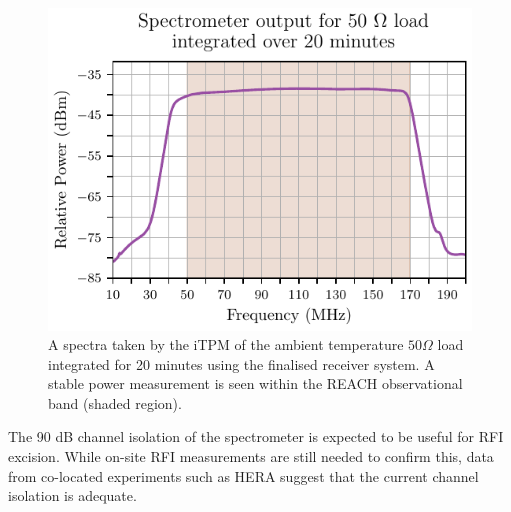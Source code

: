 \begin{figure}
    \centering
    \includegraphics{psd_cold}
    \caption{A spectra taken by the iTPM of the ambient temperature $50 \Omega$ load integrated for 20 minutes using the finalised receiver system. A stable power measurement is seen within the REACH observational band (shaded region).}
    \label{fig:psd_cold}
\end{figure}
The 90 dB channel isolation of the spectrometer is expected to be useful for RFI excision. While on-site RFI measurements are still needed to confirm this, data from co-located experiments such as HERA suggest that the current channel isolation is adequate.


